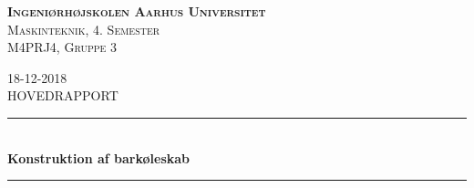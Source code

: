 \documentclass[../Hovedrapport.tex]{subfiles}
\begin{document}
\thispagestyle{empty}
    \newcommand{\HRule}{\rule{\linewidth}{0.5mm}}
    \center %
    \textsc{\LARGE \textbf{Ingeniørhøjskolen Aarhus Universitet}}   \\  [0.5cm]
    \textsc{\Large Maskinteknik, 4. Semester}                       \\  [0.5cm]
    \textsc{\large M4PRJ4, Gruppe 3}                                \\  [0.5cm]
        \date{18-12-2018}
    {\large 18-12-2018}                                             \\  [0.5cm]
    \textsc{\LARGE HOVEDRAPPORT}\\[0.3cm]
    \HRule \\[0.4cm]
    \textbf{{ \huge Konstruktion af barkøleskab}}\\[0.1cm]
    \HRule \\[0.001cm]
    
\end{document}
